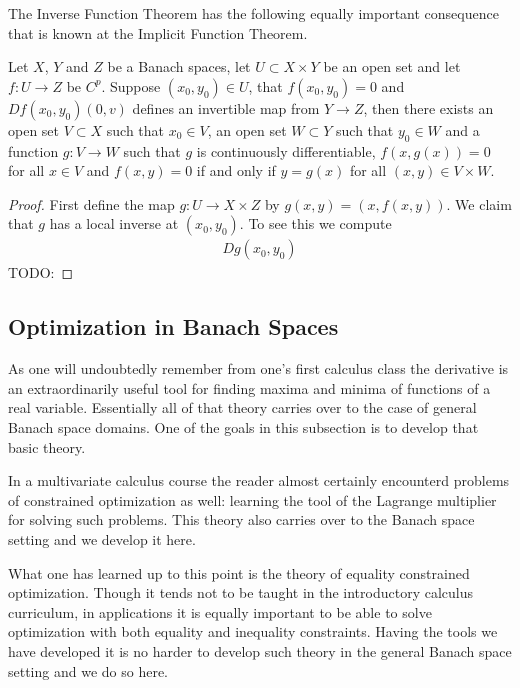 The Inverse Function Theorem has the following equally important
consequence that is known at the Implicit Function Theorem.

\begin{thm}\label{ImplicitFunctionTheorem}Let $X$, $Y$ and $Z$ be a Banach
  spaces, let $U \subset X \times Y$ be an open set  and let $f : U
  \to Z$ be $C^p$.  
Suppose $(x_0,y_0) \in U$, that $f(x_0,y_0) = 0$
  and $Df(x_0,y_0)(0,v)$ defines an invertible map from $Y \to Z$, then
  there exists an open set $V \subset X$ such that $x_0 \in V$, an
  open set $W \subset Y$ such that $y_0 \in W$ and a function $g : V \to
  W$ such that $g$ is continuously differentiable, $f(x, g(x)) = 0$
  for all $x \in V$ and $f(x,y) = 0$ if and only if $y = g(x)$ for all
  $(x,y) \in V \times W$.
\end{thm}
\begin{proof}
First define the map $g : U \to X \times Z$ by $g(x,y) = (x,
f(x,y))$.  We claim that $g$ has a local inverse at $(x_0,y_0)$.  To
see this we compute
\begin{align*}
Dg(x_0,y_0) 
\end{align*}
TODO:
\end{proof}

\subsection{Optimization in Banach Spaces}
As one will undoubtedly remember from one's first calculus class the
derivative is an extraordinarily useful tool for finding maxima and
minima of functions of a real variable.  Essentially all of that
theory carries over to the case of general Banach space domains.  One
of the goals in this subsection is to develop that basic theory.  

In a multivariate calculus course the reader almost certainly
encounterd problems of constrained optimization as well: learning the
tool of the Lagrange multiplier for solving such problems. This theory
also carries over to the Banach space setting and we develop it here.

What one has learned up to this point is the theory of equality
constrained optimization.  Though it tends not to be taught in the
introductory
calculus curriculum, in applications it is equally important to be able to
solve optimization with both equality and inequality constraints.
Having the tools we have developed it is no harder to develop such
theory in the general Banach space setting and we do so here.

